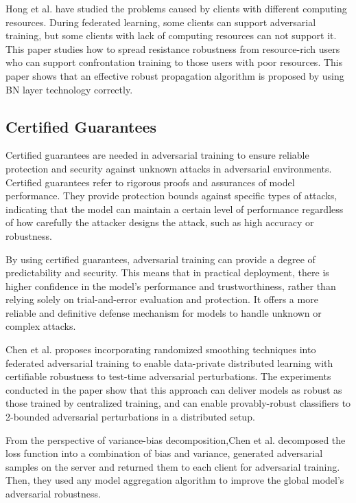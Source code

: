 \documentclass[conference]{IEEEtran}
\begin{document}
Hong et al.\cite{b105} have studied the problems caused by clients with different computing resources.
During federated learning, some clients can support adversarial training, but some clients with
lack of computing resources can not support it. This paper studies how to spread resistance robustness
from resource-rich users who can support confrontation training to those users with poor resources.
This paper shows that an effective robust propagation algorithm is proposed by using BN layer technology correctly.  

\subsection{Certified Guarantees}  
Certified guarantees are needed in adversarial training to ensure reliable protection and security against unknown attacks in adversarial environments.
Certified guarantees refer to rigorous proofs and assurances of model performance. 
They provide protection bounds against specific types of attacks, 
indicating that the model can maintain a certain level of performance regardless of how carefully the attacker designs the attack, such as high accuracy or robustness.

By using certified guarantees, adversarial training can provide a degree of predictability and security. 
This means that in practical deployment, there is higher confidence in the model's performance and trustworthiness, 
rather than relying solely on trial-and-error evaluation and protection. 
It offers a more reliable and definitive defense mechanism for models to handle unknown or complex attacks.  

Chen et al.\cite{b104} proposes incorporating randomized smoothing techniques into federated adversarial
training to enable data-private distributed learning with certifiable robustness to test-time adversarial
perturbations. The experiments conducted in the paper show that this approach can deliver models as
robust as those trained by centralized training, and can enable provably-robust classifiers to
2-bounded adversarial perturbations in a distributed setup.

From the perspective of variance-bias decomposition,Chen et al.\cite{b108} decomposed the 
loss function into a combination of bias and variance, generated adversarial samples on the server 
and returned them to each client for adversarial training. Then, they used any model aggregation 
algorithm to improve the global model's adversarial robustness.
\end{document}
